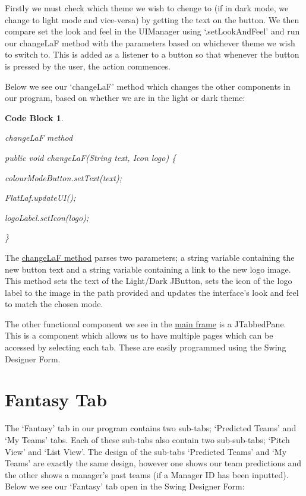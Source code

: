 \documentclass[12pt, a4paper, oneside]{book}
\newtheorem{codeblock}[theorem]{Code Block}
\numberwithin{equation}{section}
\begin{document}
Firstly we must check which theme we wish to chenge to (if in dark mode, we change to light mode and vice-versa) by getting the text on the button. We then compare set the look and feel in the UIManager using `.setLookAndFeel' and run our changeLaF method with the parameters based on whichever theme we wish to switch to. This is added as a listener to a button so that whenever the button is pressed by the user, the action commences.

Below we see our `changeLaF' method which changes the other components in our program, based on whether we are in the light or dark theme:

\begin{codeblock} \label{changeLaF method}

  changeLaF method

  public void changeLaF(String text, Icon logo) \{
  
  \hspace{\parindent}colourModeButton.setText(text);
  
  \hspace{\parindent}FlatLaf.updateUI();
  
  \hspace{\parindent}logoLabel.setIcon(logo);
  
  \}

\end{codeblock}

The \hyperref[changeLaF method]{changeLaF method} parses two parameters; a string variable containing the new button text and a string variable containing a link to the new logo image. This method sets the text of the Light/Dark JButton, sets the icon of the logo label to the image in the path provided and updates the interface's look and feel to match the chosen mode.

The other functional component we see in the \hyperref[Main frame]{main frame} is a JTabbedPane. This is a component which allows us to have multiple pages which can be accessed by selecting each tab. These are easily programmed using the Swing Designer Form.

\section{Fantasy Tab}\label{sec:8.5}

The `Fantasy' tab in our program contains two sub-tabs; `Predicted Teams' and `My Teams' tabs. Each of these sub-tabs also contain two sub-sub-tabs; `Pitch View' and `List View'. The design of the sub-tabs `Predicted Teams' and `My Teams' are exactly the same design, however one shows our team predictions and the other shows a manager's past teams (if a Manager ID has been inputted). Below we see our `Fantasy' tab open in the Swing Designer Form:
\end{document}
